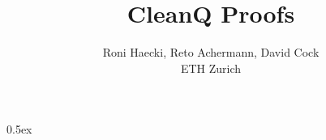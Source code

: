 \documentclass[11pt,a4paper]{article}
\begin{document}
\title{CleanQ Proofs}
\author{Roni Haecki, Reto Achermann, David Cock\\
ETH Zurich}
\maketitle

\tableofcontents

\newpage

\renewcommand{\setisabellecontext}[1]{\markright{THEORY~``#1''}}

\parindent 0pt\parskip 0.5ex


\pagestyle{headings}


\end{document}
